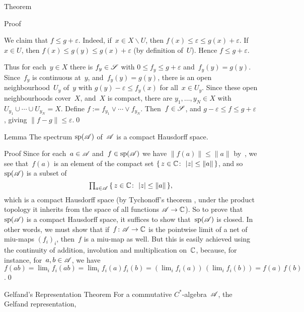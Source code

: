 \documentclass[a]{subfiles}
\begin{document}
\begin{parsec}
\begin{point}{Theorem}
\begin{point}{Proof}
\begin{point}
We claim that $f\leq g+\varepsilon$.
Indeed,
if~$x\in X\backslash U$,
then $f(x)\leq \varepsilon\leq g(x)+\varepsilon$.
If~$x\in U$,
then $f(x)\leq g(y)\leq g(x)+\varepsilon$
(by definition of~$U$).
Hence $f\leq g+\varepsilon$.
\end{point}
\begin{point}%
Thus for each~$y\in X$
there is $f_y\in \mathscr{S}$ with $0\leq f_y \leq g+\varepsilon$
and~$f_y(y)=g(y)$.
Since~$f_y$ is continuous at~$y$,
and~$f_y(y)=g(y)$,
there is an open neighbourhood~$U_y$ of~$y$
with $g(y)-\varepsilon\leq f_y(x)$
for all~$x\in U_y$.
Since these open neighbourhoods cover~$X$,
and~$X$ is compact,
there are $y_1,\dotsc,y_N\in X$
with $U_{y_1}\cup\dotsb\cup U_{y_N} = X$.
Define $f:=f_{y_1}\vee \dotsb\vee f_{y_N}$.
Then~$f\in\mathscr{S}$,
and $g-\varepsilon \leq f\leq g+\varepsilon$,
giving $\|f-g\|\leq \varepsilon$.\qed
\end{point}
\end{point}
\end{point}
\begin{point}{Lemma}%
The spectrum $\mathrm{sp}(\mathscr{A})$ of~$\mathscr{A}$ is a compact Hausdorff space.
\begin{point}{Proof}%
Since for each~$a\in \mathscr{A}$
and~$f\in \mathrm{sp}(\mathscr{A})$
we have  $\|f(a)\|\leq \|a\|$ 
by~\TODO{},
we see that~$f(a)$ is an element of the compact set
$\{\,z\in \mathbb{C}\colon\, \left|z\right|\leq\|a\|\,\}$,
and so~$\mathrm{sp}(\mathscr{A})$ is a subset of
\begin{equation*}
\textstyle
\prod_{a\in \mathscr{A}}\, \{\,z\in \mathbb{C}\colon\, \left|z\right|\leq \|a\|\,\},
\end{equation*}
which is a compact Hausdorff space
(by Tychonoff's theorem , under the product topology
it inherits
from the space of all functions $\mathscr{A}\to \mathbb{C}$).
So to prove that~$\mathrm{sp}(\mathscr{A})$
is a compact Hausdorff space,
it suffices to show that~$\mathrm{sp}(\mathscr{A})$
is closed.
In other words,
we must show that if~$f\colon \mathscr{A}\to \mathbb{C}$
is the pointwise limit of a net of miu-maps $(f_i)_i$,
then~$f$ is a miu-map as well.
But this is easily achieved
using the continuity of addition, involution and multiplication on~$\mathbb{C}$,
because, for instance, 
for~$a,b\in\mathscr{A}$, we have $f(ab)
= \lim_i f_i(ab)=\lim_i f_i(a)f_i(b)
 = (\lim_i f_i(a))\,(\lim_i f_i(b))
= f(a) \,f(b)$.\qed
\end{point}
\end{point}
\begin{point}[gelfand]{Gelfand's Representation Theorem}%
For a commutative $C^*$-algebra~$\mathscr{A}$,
the Gelfand representation, 

\end{point}
\end{parsec}
\end{document}
